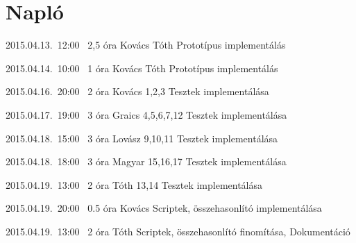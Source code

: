 %
\pagebreak
\section{Napló}

\begin{naplo}

\bejegyzes
{2015.04.13.~12:00~} %
{2,5 óra} %
{Kovács\newline
Tóth
} %
{Prototípus implementálás} %

\bejegyzes
{2015.04.14.~10:00~} %
{1 óra} %
{Kovács\newline
Tóth
} %
{Prototípus implementálás} %

\bejegyzes
{2015.04.16.~20:00~} %
{2 óra} %
{Kovács
} %
{1,2,3 Tesztek implementálása } %

\bejegyzes
{2015.04.17.~19:00~} %
{3 óra} %
{Graics
} %
{4,5,6,7,12 Tesztek implementálása} %

\bejegyzes
{2015.04.18.~15:00~} %
{3 óra} %
{Lovász
} %
{9,10,11 Tesztek implementálása} %

\bejegyzes
{2015.04.18.~18:00~} %
{3 óra} %
{Magyar
} %
{15,16,17 Tesztek implementálása} %

\bejegyzes
{2015.04.19.~13:00~} %
{2 óra} %
{Tóth
} %
{13,14 Tesztek implementálása} %

\bejegyzes
{2015.04.19.~20:00~} %
{0.5 óra} %
{Kovács
} %
{Scriptek, összehasonlító implementálása} %

\bejegyzes
{2015.04.19.~13:00~} %
{2 óra} %
{Tóth
} %
{Scriptek, összehasonlító finomítása, 
Dokumentáció} %


\end{naplo}

